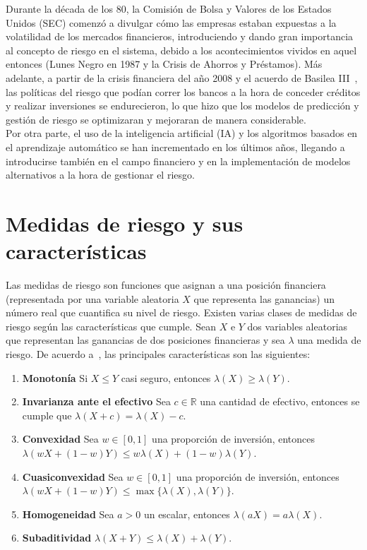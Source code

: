 \documentclass[11pt]{book}
\theoremstyle{plain} %
\theoremstyle{definition} %
\begin{document}
Durante la década de los 80, la Comisión de Bolsa y Valores de los Estados 
Unidos (SEC) comenzó a divulgar cómo las empresas estaban expuestas a la 
volatilidad de los mercados financieros, introduciendo y dando gran 
importancia al concepto de riesgo en el sistema, debido a los acontecimientos 
vividos en aquel entonces (Lunes Negro en 1987 y la Crisis de Ahorros y 
Préstamos). Más adelante, a partir de la crisis financiera del año 2008 y el 
acuerdo de Basilea III~\cite{BIS}, las políticas del riesgo que podían correr los bancos 
a la hora de conceder créditos y realizar inversiones se endurecieron, lo que 
hizo que los modelos de predicción y gestión de riesgo se optimizaran y 
mejoraran de manera considerable.\\

Por otra parte, el uso de la inteligencia artificial (IA) y los algoritmos basados 
en el aprendizaje automático se han incrementado en los últimos años, llegando 
a introducirse también en el campo financiero y en la implementación de 
modelos alternativos a la hora de gestionar el riesgo. \\
\section{Medidas de riesgo y sus características}
Las medidas de riesgo son funciones que asignan a una posición financiera 
(representada por una variable aleatoria $X$ que representa las ganancias) un 
número real que cuantifica su nivel de riesgo. Existen varias clases de medidas 
de riesgo según las características que cumple. Sean $X$ e $Y$ dos variables 
aleatorias que representan las ganancias de dos posiciones financieras y 
sea $\lambda$ una medida de riesgo. De acuerdo a~\cite{FS08}, 
las principales características son las 
siguientes: 
\begin{enumerate}
   \item \textbf{Monotonía} Si $X \leq Y$ casi seguro, entonces $\lambda(X) \geq \lambda(Y)$.
   \item \textbf{Invarianza ante el efectivo} Sea $c \in \mathbb{R}$ una 
   cantidad de efectivo, entonces se cumple que $\lambda(X+c) = \lambda(X)- c$.
   \item \textbf{Convexidad} Sea $w \in [0,1]$ una proporción de inversión, entonces
   $\lambda(wX + (1-w)Y) \leq w\lambda(X) + (1-w)\lambda(Y)$.
   \item \textbf{Cuasiconvexidad} Sea $w \in [0,1]$ una proporción de inversión, entonces
   $\lambda(wX + (1-w)Y) \leq \max\{\lambda(X),\lambda(Y)\}$.
   \item \textbf{Homogeneidad} Sea $a > 0$ un escalar, entonces $\lambda(aX) = a\lambda(X)$.
   \item \textbf{Subaditividad}  $\lambda(X+Y) \leq \lambda(X) + \lambda(Y)$.
\end{enumerate}
\end{document}
